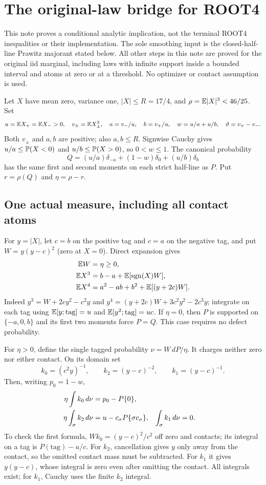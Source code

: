 \section{The original-law bridge for ROOT4}
\label{r4bridge:section}

This note proves a conditional analytic implication, not the terminal
ROOT4 inequalities or their implementation. The sole smoothing input is
the closed-half-line Prawitz majorant stated below. All other steps in
this note are proved for the original iid marginal, including laws with
infinite support inside a bounded interval and atoms at zero or at a
threshold. No optimizer or contact assumption is used.

Let $X$ have mean zero, variance one, $|X|\le R=17/4$, and
$\rho=\mathbb E|X|^3<46/25$. Set
\[
 u=\mathbb E X_+=\mathbb E X_->0,\quad v_\pm=\mathbb E X_\pm^2,
 \quad a=v_-/u,\quad b=v_+/u,\quad
 w=u/a+u/b,\quad \vartheta=v_+-v_-.
\]
Both $v_\pm$ and $a,b$ are positive; also $a,b\le R$.
Signwise Cauchy gives $u/a\le\mathbb P(X<0)$ and
$u/b\le\mathbb P(X>0)$, so $0<w\le1$. The canonical probability
\[
 Q=(u/a)\delta_{-a}+(1-w)\delta_0+(u/b)\delta_b
\]
has the same first and second moments on each strict half-line as $P$.
Put $r=\rho(Q)$ and $\eta=\rho-r$.

\subsection{One actual measure, including all contact atoms}
For $y=|X|$, let $c=b$ on the positive tag and $c=a$ on the
negative tag, and put $W=y(y-c)^2$ (zero at $X=0$). Direct expansion gives
\begin{align}
 \mathbb E W&=\eta\ge0,\label{r4bridge:excess}\\
 \mathbb E X^3&=b-a+\mathbb E[\operatorname{sgn}(X)W],\notag\\
 \mathbb E X^4&=a^2-ab+b^2+\mathbb E[(y+2c)W].\label{r4bridge:moments}
\end{align}
Indeed $y^3=W+2cy^2-c^2y$ and
$y^4=(y+2c)W+3c^2y^2-2c^3y$; integrate on each tag using
$\mathbb E[y;\text{tag}]=u$ and $\mathbb E[y^2;\text{tag}]=uc$.
If $\eta=0$, then $P$ is supported on $\{-a,0,b\}$ and its
first two moments force $P=Q$. This case requires no defect probability.

For $\eta>0$, define the single tagged probability $\nu=W\,dP/\eta$.
It charges neither zero nor either contact. On its domain set
\[
 k_0=(c^2y)^{-1},\qquad k_2=(y-c)^{-2},\qquad k_1=(y-c)^{-1}.
\]
Then, writing $p_0=1-w$,
\begin{align}
 \eta\int k_0\,d\nu&=p_0-P\{0\},\notag\\
 \eta\int_{\sigma} k_2\,d\nu&=u-c_\sigma P\{\sigma c_\sigma\},
 &\int_{\sigma}k_1\,d\nu&=0.\label{r4bridge:budgets}
\end{align}
To check the first formula, $Wk_0=(y-c)^2/c^2$ off zero and
contacts; its integral on a tag is $P(\text{tag})-u/c$.
For $k_2$, cancellation gives $y$ only away from the contact,
so the omitted contact mass must be subtracted. For $k_1$ it gives
$y(y-c)$, whose integral is zero even after omitting the contact.
All integrals exist; for $k_1$, Cauchy uses the finite $k_2$ integral.

